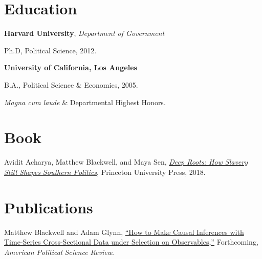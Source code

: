 \documentclass[margin,line,12pt]{res}
\newenvironment{list1}{
  \begin{list}{\ding{113}}{%
      \setlength{\itemsep}{0in}
      \setlength{\parsep}{0in} \setlength{\parskip}{0in}
      \setlength{\topsep}{0in} \setlength{\partopsep}{0in} 
      \setlength{\leftmargin}{0.83 cm}}}{\end{list}}
\begin{document}
\begin{resume}
\section{\sc Education}

{\bf Harvard University}, {\em Department of Government}
\begin{list1}
\item[] Ph.D, Political Science, 2012. 
\end{list1}
{\bf University of California, Los Angeles}
\begin{list1}
\item[] B.A., Political Science \& Economics, 2005.
\item[] \emph{Magna cum laude} \& Departmental Highest Honors.
\end{list1}

\section{\sc Book}

Avidit Acharya, Matthew Blackwell, and Maya Sen, \href{http://www.mattblackwell.org/slavery-book/}{\emph{Deep Roots: How Slavery Still Shapes Southern Politics}}, Princeton University Press, 2018.

\section{\sc Publications}
Matthew Blackwell and Adam Glynn, \href{http://www.mattblackwell.org/files/papers/causal-tscs.pdf}{``How to Make Causal Inferences with Time-Series
  Cross-Sectional Data under Selection on Observables,''} Forthcoming, \emph{American Political Science Review}.


\end{resume}
\end{document}
